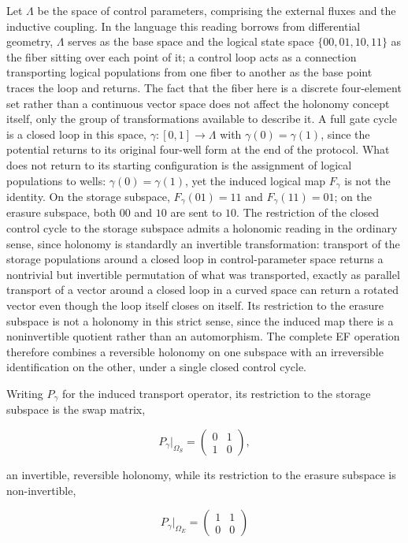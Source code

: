 \documentclass[11pt]{article}
\begin{document}
Let $\Lambda$ be the space of control parameters, comprising the external fluxes and the inductive coupling. In the language this reading borrows from differential geometry, $\Lambda$ serves as the base space and the logical state space $\{00,01,10,11\}$ as the fiber sitting over each point of it; a control loop acts as a connection transporting logical populations from one fiber to another as the base point traces the loop and returns. The fact that the fiber here is a discrete four-element set rather than a continuous vector space does not affect the holonomy concept itself, only the group of transformations available to describe it. A full gate cycle is a closed loop in this space, $\gamma:[0,1]\to\Lambda$ with $\gamma(0)=\gamma(1)$, since the potential returns to its original four-well form at the end of the protocol. What does not return to its starting configuration is the assignment of logical populations to wells: $\gamma(0)=\gamma(1)$, yet the induced logical map $F_\gamma$ is not the identity. On the storage subspace, $F_\gamma(01)=11$ and $F_\gamma(11)=01$; on the erasure subspace, both $00$ and $10$ are sent to $10$. The restriction of the closed control cycle to the storage subspace admits a holonomic reading in the ordinary sense, since holonomy is standardly an invertible transformation: transport of the storage populations around a closed loop in control-parameter space returns a nontrivial but invertible permutation of what was transported, exactly as parallel transport of a vector around a closed loop in a curved space can return a rotated vector even though the loop itself closes on itself. Its restriction to the erasure subspace is not a holonomy in this strict sense, since the induced map there is a noninvertible quotient rather than an automorphism. The complete EF operation therefore combines a reversible holonomy on one subspace with an irreversible identification on the other, under a single closed control cycle.

Writing $P_\gamma$ for the induced transport operator, its restriction to the storage subspace is the swap matrix,

\[
P_\gamma\big\vert_{\Omega_S} = \begin{pmatrix}0&1\\1&0\end{pmatrix},
\]

an invertible, reversible holonomy, while its restriction to the erasure subspace is non-invertible,

\[
P_\gamma\big\vert_{\Omega_E} = \begin{pmatrix}1&1\\0&0\end{pmatrix}
\]
\end{document}
